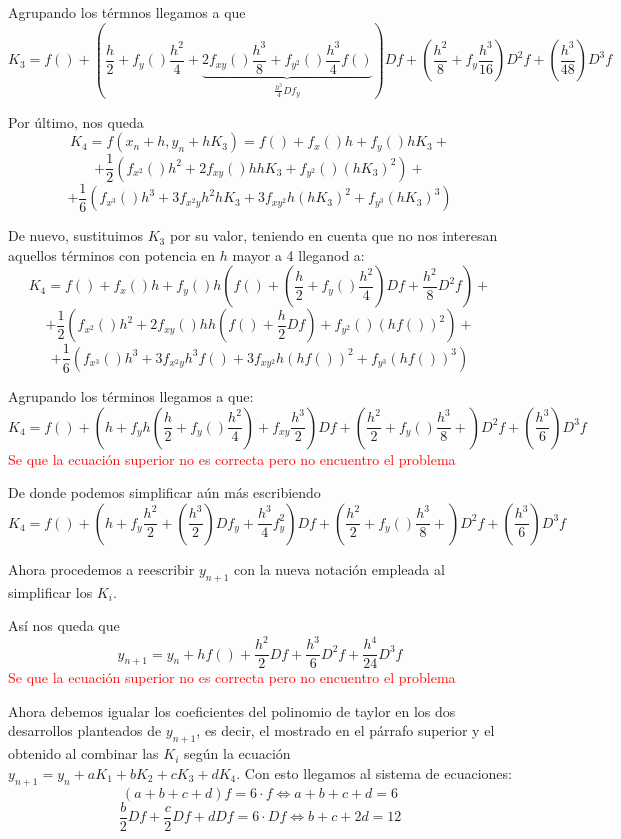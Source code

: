 \documentclass[nochap]{apuntes}
\begin{document}
Agrupando los térmnos llegamos a que
\[K_3 = f()+\left(\frac{h}{2}+f_y()\frac{h^2}{4}+\underbrace{2f_{xy}()\frac{h^3}{8}+f_{y^2}()\frac{h^3}{4}f()}_{\frac{h^3}{4}Df_y}\right)Df+\left(\frac{h^2}{8} + f_y\frac{h^3}{16}\right)D^2f +\left(\frac{h^3}{48}\right)D^3f\]

Por último, nos queda
\[K_4 = f\left(x_n+h,y_n+hK_3\right)=f()+f_x()h+f_y()hK_3 +\]
\[+ \frac{1}{2}\left( f_{x^2}()h^2 +2 f_{xy}()hhK_3 +f_{y^2}()\left(hK_3\right)^2\right) +\]
\[+   \frac{1}{6}\left( f_{x^3}()h^3 + 3f_{x^2y}h^2hK_3 + 3f_{xy^2}h\left(hK_3\right)^2 + f_{y^3}\left(hK_3\right)^3\right)\]

De nuevo, sustituimos $K_3$ por su valor, teniendo en cuenta que no nos interesan aquellos términos con potencia en $h$ mayor a 4 lleganod a:
\[K_4 = f()+f_x()h+f_y()h\left( f()+\left(\frac{h}{2}+f_y()\frac{h^2}{4}\right)Df + \frac{h^2}{8}D^2f\right) +\]
\[+ \frac{1}{2}\left( f_{x^2}()h^2 +2 f_{xy}()hh\left(f()+\frac{h}{2}Df\right) +f_{y^2}()\left(hf()\right)^2\right) +\]
\[+   \frac{1}{6}\left( f_{x^3}()h^3 + 3f_{x^2y}h^3f() + 3f_{xy^2}h\left(hf()\right)^2 + f_{y^3}\left(hf()\right)^3\right)\]

Agrupando los términos llegamos a que:
\[K_4 = f() + \left(h +f_yh\left(\frac{h}{2}+f_y()\frac{h^2}{4} \right)+f_{xy}\frac{h^3}{2}\right)Df + \left( \frac{h^2}{2} + f_y()\frac{h^3}{8}+\right) D^2f + \left( \frac{h^3}{6}\right) D^3f\]
\textcolor{red}{Se que la ecuación superior no es correcta pero no encuentro el problema}

De donde podemos simplificar aún más escribiendo
\[K_4 = f() + \left(h +f_y\frac{h^2}{2}+\left(\frac{h^3}{2}\right)Df_y + \frac{h^3}{4}f_y^2\right)Df + \left( \frac{h^2}{2} + f_y()\frac{h^3}{8}+\right) D^2f + \left( \frac{h^3}{6}\right) D^3f\]

Ahora procedemos a reescribir $y_{n+1}$ con la nueva notación empleada al simplificar los $K_i$.

Así nos queda que
\[y_{n+1}=y_n+hf() + \frac{h^2}{2}Df+\frac{h^3}{6}D^2f + \frac{h^4}{24}D^3f\]
\textcolor{red}{Se que la ecuación superior no es correcta pero no encuentro el problema}

Ahora debemos igualar los coeficientes del polinomio de taylor en los dos desarrollos planteados de $y_{n+1}$, es decir, el mostrado en el párrafo superior y el obtenido al combinar las $K_i$ según la ecuación $y_{n+1} = y_n + aK_1+bK_2+cK_3+dK_4$. Con esto llegamos al sistema de ecuaciones:
\[
(a+b+c+d)f= 6\cdot f \iff a+b+c+d = 6 \]
\[\frac{b}{2}Df + \frac{c}{2}Df + dDf= 6\cdot Df  \iff b+c+2d = 12\]
\end{document}
